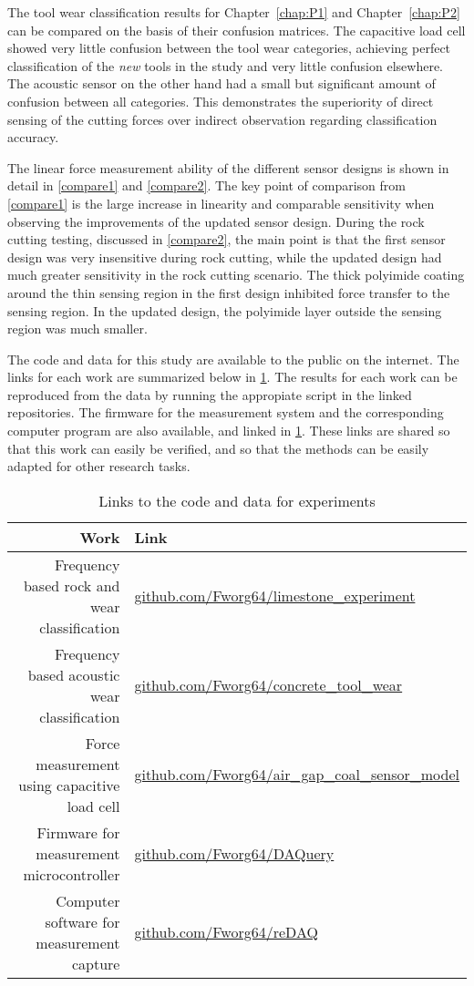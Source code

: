 The tool wear classification results for Chapter~\ref{chap:P1} and Chapter~\ref{chap:P2} can be compared 
on the basis of their confusion matrices. The capacitive load cell showed very little confusion between the tool wear
categories, achieving perfect classification of the \textit{new} tools in the study and very little confusion elsewhere.
The acoustic sensor on the other hand had a small but significant amount of confusion between all categories.
This demonstrates the superiority of direct sensing of the cutting forces over indirect observation regarding classification accuracy.

The linear force measurement ability of the different sensor designs is shown in detail in \ref{compare1} and \ref{compare2}.
The key point of comparison from \ref{compare1} is the large increase in linearity and comparable sensitivity 
when observing the improvements of the updated sensor design. During the rock cutting testing, discussed in \ref{compare2},
the main point is that the first sensor design was very insensitive during rock cutting, while the updated design had
much greater sensitivity in the rock cutting scenario. The thick polyimide coating around the thin sensing region
in the first design inhibited force transfer to the sensing region. In the updated design, the polyimide layer
outside the sensing region was much smaller.

The code and data for this study are available to the public on the internet. 
The links for each work are summarized below in \ref{tab:links}.
The results for each work can be reproduced from the data by running the appropiate script in the linked repositories.
The firmware for the measurement system and the corresponding computer program are also available, and linked in \ref{tab:links}.
These links are shared so that this work can easily be verified, and so that the methods can be easily adapted for other research tasks.

\begin{table}[]
\centering
\caption{Links to the code and data for experiments}
\label{tab:links}
\begin{tabular}{|r|l|}
\hline
Work                                                  & Link \\ \hline
Frequency based rock and wear classification & \url{github.com/Fworg64/limestone_experiment}     \\ \hline
Frequency based acoustic wear classification     &  \url{github.com/Fworg64/concrete_tool_wear}    \\ \hline
Force measurement using capacitive load cell          &  \url{github.com/Fworg64/air_gap_coal_sensor_model}    \\ \hline
Firmware for measurement microcontroller       &  \url{github.com/Fworg64/DAQuery}    \\ \hline
Computer software for measurement capture             &  \url{github.com/Fworg64/reDAQ}    \\ \hline
\end{tabular}
\end{table}

